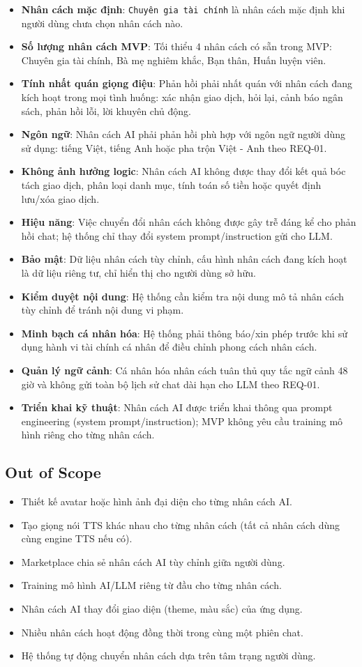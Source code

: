 \begin{itemize}
\item \textbf{Nhân cách mặc định}: \texttt{Chuyên gia tài chính} là nhân cách mặc định khi người dùng chưa chọn nhân cách nào.
\item \textbf{Số lượng nhân cách MVP}: Tối thiểu 4 nhân cách có sẵn trong MVP: Chuyên gia tài chính, Bà mẹ nghiêm khắc, Bạn thân, Huấn luyện viên.
\item \textbf{Tính nhất quán giọng điệu}: Phản hồi phải nhất quán với nhân cách đang kích hoạt trong mọi tình huống: xác nhận giao dịch, hỏi lại, cảnh báo ngân sách, phản hồi lỗi, lời khuyên chủ động.
\item \textbf{Ngôn ngữ}: Nhân cách AI phải phản hồi phù hợp với ngôn ngữ người dùng sử dụng: tiếng Việt, tiếng Anh hoặc pha trộn Việt - Anh theo REQ-01.
\item \textbf{Không ảnh hưởng logic}: Nhân cách AI không được thay đổi kết quả bóc tách giao dịch, phân loại danh mục, tính toán số tiền hoặc quyết định lưu/xóa giao dịch.
\item \textbf{Hiệu năng}: Việc chuyển đổi nhân cách không được gây trễ đáng kể cho phản hồi chat; hệ thống chỉ thay đổi system prompt/instruction gửi cho LLM.
\item \textbf{Bảo mật}: Dữ liệu nhân cách tùy chỉnh, cấu hình nhân cách đang kích hoạt là dữ liệu riêng tư, chỉ hiển thị cho người dùng sở hữu.
\item \textbf{Kiểm duyệt nội dung}: Hệ thống cần kiểm tra nội dung mô tả nhân cách tùy chỉnh để tránh nội dung vi phạm.
\item \textbf{Minh bạch cá nhân hóa}: Hệ thống phải thông báo/xin phép trước khi sử dụng hành vi tài chính cá nhân để điều chỉnh phong cách nhân cách.
\item \textbf{Quản lý ngữ cảnh}: Cá nhân hóa nhân cách tuân thủ quy tắc ngữ cảnh 48 giờ và không gửi toàn bộ lịch sử chat dài hạn cho LLM theo REQ-01.
\item \textbf{Triển khai kỹ thuật}: Nhân cách AI được triển khai thông qua prompt engineering (system prompt/instruction); MVP không yêu cầu training mô hình riêng cho từng nhân cách.
\end{itemize}
\subsection{Out of Scope}

\begin{itemize}
\item Thiết kế avatar hoặc hình ảnh đại diện cho từng nhân cách AI.
\item Tạo giọng nói TTS khác nhau cho từng nhân cách (tất cả nhân cách dùng cùng engine TTS nếu có).
\item Marketplace chia sẻ nhân cách AI tùy chỉnh giữa người dùng.
\item Training mô hình AI/LLM riêng từ đầu cho từng nhân cách.
\item Nhân cách AI thay đổi giao diện (theme, màu sắc) của ứng dụng.
\item Nhiều nhân cách hoạt động đồng thời trong cùng một phiên chat.
\item Hệ thống tự động chuyển nhân cách dựa trên tâm trạng người dùng.
\end{itemize}
